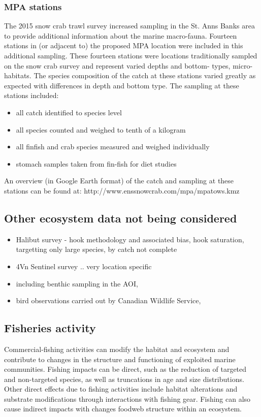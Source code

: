 \documentclass[letterpaper,portrait,11pt]{scrartcl}
\numberwithin{equation}{section}		%
\numberwithin{figure}{section}		%
\numberwithin{table}{section}				%
\begin{document}
\subsubsection{MPA stations}

The 2015 snow crab trawl survey increased sampling in the St. Anns Banks area to provide additional information about the marine macro-fauna. Fourteen stations in (or adjacent to) the proposed MPA location were included in this additional sampling. These fourteen stations were locations traditionally sampled on the snow crab survey and represent varied depths and bottom- types, micro-habitats. The species composition of the catch at these stations varied greatly as expected with differences in depth and bottom type. The sampling at these stations included:

\begin{itemize}
  \item all catch identified to species level
  \item all species counted and weighed to tenth of a kilogram
  \item all finfish and crab species measured and weighed individually
  \item stomach samples taken from fin-fish for diet studies
\end{itemize}

An overview (in Google Earth format) of the catch and sampling at these stations can be found at: http://www.enssnowcrab.com/mpa/mpatows.kmz

\subsection{Other ecosystem data not being considered}
\begin{itemize}
   \item Halibut survey - hook methodology and associated bias, hook saturation, targetting only large species, by catch not complete 
   \item 4Vn Sentinel survey .. very location specific
   \item including benthic sampling in the AOI, 
   \item bird observations carried out by Canadian Wildlife Service, 
\end{itemize}	
  
\clearpage

\subsection{Fisheries activity}
Commercial-fishing activities can modify the habitat and ecosystem and contribute to changes in the structure and functioning of exploited marine communities.  Fishing impacts can be direct, such as the reduction of targeted and non-targeted species, as well as truncations in age and size distributions.  Other direct effects due to fishing activities include habitat alterations and substrate modifications through interactions with fishing gear. Fishing can also cause indirect impacts with changes foodweb structure within an ecosystem.  
\end{document}
